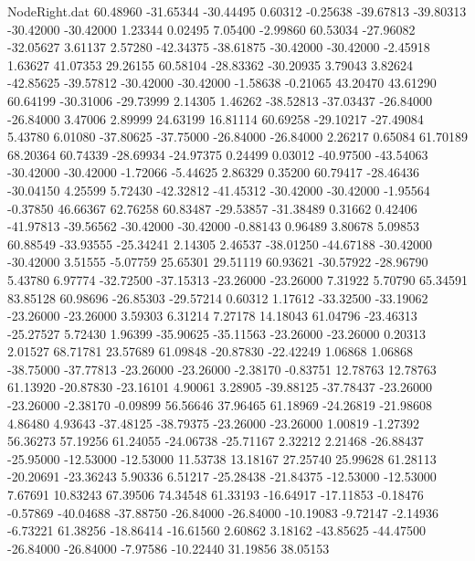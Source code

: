 \begin{filecontents}{NodeRight.dat}
  60.48960  -31.65344  -30.44495     0.60312   -0.25638  -39.67813  -39.80313  -30.42000  -30.42000    1.23344    0.02495    7.05400   -2.99860
  60.53034  -27.96082  -32.05627     3.61137    2.57280  -42.34375  -38.61875  -30.42000  -30.42000   -2.45918    1.63627   41.07353   29.26155
  60.58104  -28.83362  -30.20935     3.79043    3.82624  -42.85625  -39.57812  -30.42000  -30.42000   -1.58638   -0.21065   43.20470   43.61290
  60.64199  -30.31006  -29.73999     2.14305    1.46262  -38.52813  -37.03437  -26.84000  -26.84000    3.47006    2.89999   24.63199   16.81114
  60.69258  -29.10217  -27.49084     5.43780    6.01080  -37.80625  -37.75000  -26.84000  -26.84000    2.26217    0.65084   61.70189   68.20364
  60.74339  -28.69934  -24.97375     0.24499    0.03012  -40.97500  -43.54063  -30.42000  -30.42000   -1.72066   -5.44625    2.86329    0.35200
  60.79417  -28.46436  -30.04150     4.25599    5.72430  -42.32812  -41.45312  -30.42000  -30.42000   -1.95564   -0.37850   46.66367   62.76258
  60.83487  -29.53857  -31.38489     0.31662    0.42406  -41.97813  -39.56562  -30.42000  -30.42000   -0.88143    0.96489    3.80678    5.09853
  60.88549  -33.93555  -25.34241     2.14305    2.46537  -38.01250  -44.67188  -30.42000  -30.42000    3.51555   -5.07759   25.65301   29.51119
  60.93621  -30.57922  -28.96790     5.43780    6.97774  -32.72500  -37.15313  -23.26000  -23.26000    7.31922    5.70790   65.34591   83.85128
  60.98696  -26.85303  -29.57214     0.60312    1.17612  -33.32500  -33.19062  -23.26000  -23.26000    3.59303    6.31214    7.27178   14.18043
  61.04796  -23.46313  -25.27527     5.72430    1.96399  -35.90625  -35.11563  -23.26000  -23.26000    0.20313    2.01527   68.71781   23.57689
  61.09848  -20.87830  -22.42249     1.06868    1.06868  -38.75000  -37.77813  -23.26000  -23.26000   -2.38170   -0.83751   12.78763   12.78763
  61.13920  -20.87830  -23.16101     4.90061    3.28905  -39.88125  -37.78437  -23.26000  -23.26000   -2.38170   -0.09899   56.56646   37.96465
  61.18969  -24.26819  -21.98608     4.86480    4.93643  -37.48125  -38.79375  -23.26000  -23.26000    1.00819   -1.27392   56.36273   57.19256
  61.24055  -24.06738  -25.71167     2.32212    2.21468  -26.88437  -25.95000  -12.53000  -12.53000   11.53738   13.18167   27.25740   25.99628
  61.28113  -20.20691  -23.36243     5.90336    6.51217  -25.28438  -21.84375  -12.53000  -12.53000    7.67691   10.83243   67.39506   74.34548
  61.33193  -16.64917  -17.11853    -0.18476   -0.57869  -40.04688  -37.88750  -26.84000  -26.84000  -10.19083   -9.72147   -2.14936   -6.73221
  61.38256  -18.86414  -16.61560     2.60862    3.18162  -43.85625  -44.47500  -26.84000  -26.84000   -7.97586  -10.22440   31.19856   38.05153

\end{filecontents}
